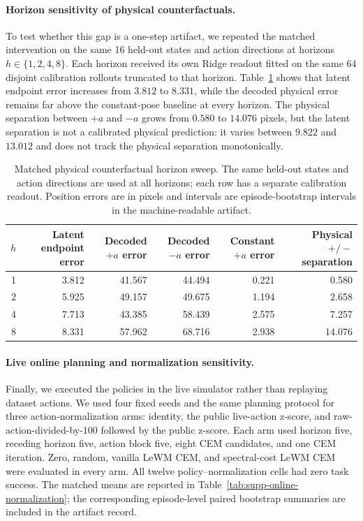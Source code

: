 \documentclass{article}
\begin{document}
\paragraph{Horizon sensitivity of physical counterfactuals.}
To test whether this gap is a one-step artifact, we repeated the matched
intervention on the same 16 held-out states and action directions at horizons
$h\in\{1,2,4,8\}$.  Each horizon received its own Ridge readout fitted on the
same 64 disjoint calibration rollouts truncated to that horizon.  Table~\ref{tab:supp-counterfactual-horizon}
shows that latent endpoint error increases from $3.812$ to $8.331$, while the
decoded physical error remains far above the constant-pose baseline at every
horizon.  The physical separation between $+a$ and $-a$ grows from $0.580$ to
$14.076$ pixels, but the latent separation is not a calibrated physical
prediction: it varies between $9.822$ and $13.012$ and does not track the
physical separation monotonically.

\begin{table}[H]
\centering
\scriptsize
\caption{Matched physical counterfactual horizon sweep.  The same held-out
states and action directions are used at all horizons; each row has a separate
calibration readout.  Position errors are in pixels and intervals are
episode-bootstrap intervals in the machine-readable artifact.}
\label{tab:supp-counterfactual-horizon}
\begin{tabular}{rrrrrr}
\toprule
$h$ & Latent endpoint error & Decoded $+a$ error & Decoded $-a$ error & Constant $+a$ error & Physical $+/-$ separation \\
\midrule
1 & 3.812 & 41.567 & 44.494 & 0.221 & 0.580 \\
2 & 5.925 & 49.157 & 49.675 & 1.194 & 2.658 \\
4 & 7.713 & 43.385 & 58.439 & 2.575 & 7.257 \\
8 & 8.331 & 57.962 & 68.716 & 2.938 & 14.076 \\
\bottomrule
\end{tabular}
\end{table}

\paragraph{Live online planning and normalization sensitivity.}
Finally, we executed the policies in the live simulator rather than replaying
dataset actions.  We used four fixed seeds and the same planning protocol for
three action-normalization arms: identity, the public live-action z-score, and
raw-action-divided-by-100 followed by the public z-score.  Each arm used
horizon five, receding horizon five, action block five, eight CEM candidates,
and one CEM iteration.  Zero, random, vanilla LeWM CEM, and spectral-cost LeWM
CEM were evaluated in every arm.  All twelve policy--normalization cells had
zero task success.  The matched means are reported in
Table~\ref{tab:supp-online-normalization}; the corresponding episode-level
paired bootstrap summaries are included in the artifact record.
\end{document}
